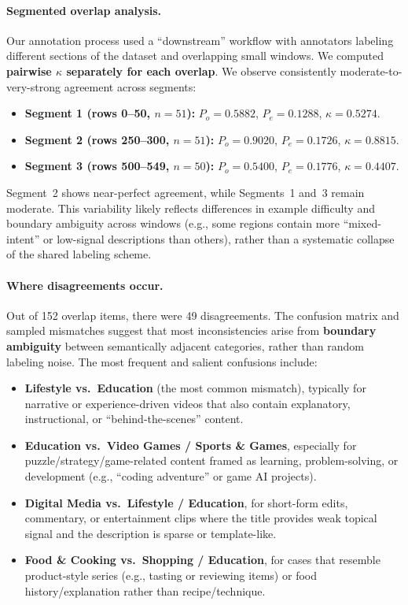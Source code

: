 \documentclass[11pt]{article}
\begin{document}
\paragraph{Segmented overlap analysis.}
Our annotation process used a ``downstream'' workflow with annotators labeling different sections of the
dataset and overlapping small windows. We
computed \textbf{pairwise $\kappa$ separately for each overlap}. We observe consistently moderate-to-very-strong agreement across segments:
\begin{itemize}
  \item \textbf{Segment 1 (rows 0--50, $n=51$):} $P_o=0.5882$, $P_e=0.1288$, $\kappa=0.5274$.
  \item \textbf{Segment 2 (rows 250--300, $n=51$):} $P_o=0.9020$, $P_e=0.1726$, $\kappa=0.8815$.
  \item \textbf{Segment 3 (rows 500--549, $n=50$):} $P_o=0.5400$, $P_e=0.1776$, $\kappa=0.4407$.
\end{itemize}
Segment~2 shows near-perfect agreement, while Segments~1 and~3 remain moderate. This variability likely reflects
differences in example difficulty and boundary ambiguity across windows (e.g., some regions contain more ``mixed-intent''
or low-signal descriptions than others), rather than a systematic collapse of the shared labeling scheme.

\paragraph{Where disagreements occur.}
Out of 152 overlap items, there were 49 disagreements. The confusion matrix and sampled mismatches suggest that most
inconsistencies arise from \textbf{boundary ambiguity} between semantically adjacent categories, rather than random
labeling noise. The most frequent and salient confusions include:
\begin{itemize}
  \item \textbf{Lifestyle vs.\ Education} (the most common mismatch), typically for narrative or experience-driven videos
  that also contain explanatory, instructional, or ``behind-the-scenes'' content.
  \item \textbf{Education vs.\ Video Games / Sports \& Games}, especially for puzzle/strategy/game-related content framed
  as learning, problem-solving, or development (e.g., ``coding adventure'' or game AI projects).
  \item \textbf{Digital Media vs.\ Lifestyle / Education}, for short-form edits, commentary, or entertainment clips where
  the title provides weak topical signal and the description is sparse or template-like.
  \item \textbf{Food \& Cooking vs.\ Shopping / Education}, for cases that resemble product-style series (e.g., tasting or
  reviewing items) or food history/explanation rather than recipe/technique.
\end{itemize}
\end{document}
